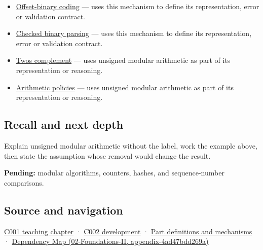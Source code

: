 \begin{itemize}
\item
  \hyperref[appendix-53a8cfb25f8d]{Offset-binary coding} --- uses this mechanism to define its representation, error or validation contract.
\item
  \hyperref[appendix-652d81568de9]{Checked binary parsing} --- uses this mechanism to define its representation, error or validation contract.
\item
  \hyperref[appendix-4fbc03d20829]{Two\textquotesingle s complement} --- uses unsigned modular arithmetic as part of its representation or reasoning.
\item
  \hyperref[appendix-2ed044358b82]{Arithmetic policies} --- uses unsigned modular arithmetic as part of its representation or reasoning.
\end{itemize}

\subsection{Recall and next depth}\label{appendix-c99977d88b33-recall-and-next-depth}

Explain unsigned modular arithmetic without the label, work the example above, then state the assumption whose removal would change the result.

\textbf{Pending:} modular algorithms, counters, hashes, and sequence-number comparisons.

\subsection{Source and navigation}\label{appendix-c99977d88b33-source-and-navigation}

\hyperref[01-foundations-i-ch001-from-a-signal-to-an-interpretation]{C001 teaching chapter} · \hyperref[01-foundations-i-ch001-arithmetic-becomes-a-policy]{C002 development} · \hyperref[appendix-fd090d982a15]{Part definitions and mechanisms} · \href{../02-Foundations-II/main.pdf\#nameddest=appendix-4ad47bdd269a}{Dependency Map (02-Foundations-II, appendix-4ad47bdd269a)}
